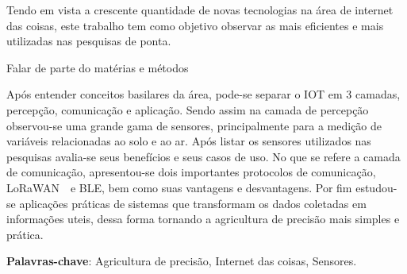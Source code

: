 \documentclass[
article,			%
12pt,				%
oneside,			%
a4paper,			%
english,			%
brazil,				%
sumario=tradicional
]{abntex2}
\begin{document}

\frenchspacing 


%
%

\maketitle



\begin{resumoumacoluna}
    Tendo em vista a crescente quantidade de novas tecnologias na área de internet das coisas, este trabalho tem como objetivo observar as mais eficientes e mais utilizadas nas pesquisas de ponta.

    Falar de parte do matérias e métodos

    Após entender conceitos basilares da área, pode-se separar o IOT em 3 camadas, percepção, comunicação e aplicação. Sendo assim na camada de percepção observou-se uma grande gama de sensores, principalmente para a medição de variáveis relacionadas ao solo e ao ar. Após listar os sensores utilizados nas pesquisas avalia-se seus benefícios e seus casos de uso. No que se refere a camada de comunicação, apresentou-se dois importantes protocolos de comunicação, LoRaWAN~\texttrademark~e BLE, bem como suas vantagens e desvantagens. Por fim estudou-se aplicações práticas de sistemas que transformam os dados coletadas em informações uteis, dessa forma tornando a agricultura de precisão mais simples e prática.

  \textbf{Palavras-chave}: Agricultura de precisão, Internet das coisas, Sensores.

  \vspace{\onelineskip}

  \noindent
\end{resumoumacoluna}
\end{document}
